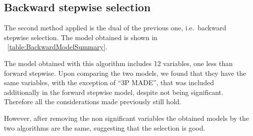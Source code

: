 \subsection{Backward stepwise selection}

The second method applied is the dual of the previous one, i.e.\ backward stepwise selection. The model obtained is shown in \Tab~\ref{table:BackwardModelSummary}.

The model obtained with this algorithm includes 12 variables, one less than forward stepwise. Upon comparing the two models, we found that they have the same variables, with the exception of ``3P MADE'', that was included additionally in the forward stepwise model, despite not being significant.
Therefore all the considerations made previously still hold.

However, after removing the non significant variables the obtained models by the two algorithms are the same, suggesting that the selection is good.
